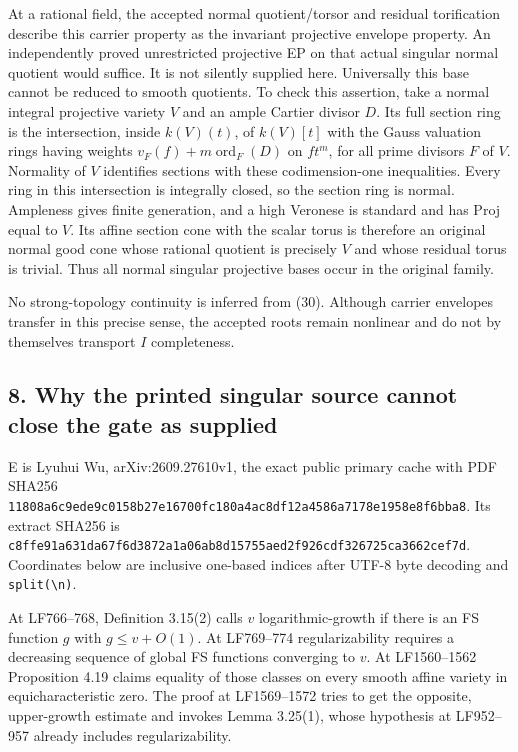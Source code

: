 \documentclass[
  10pt,
]{article}
\begin{document}
At a rational field, the accepted normal quotient/torsor and residual
torification describe this carrier property as the invariant projective
envelope property. An independently proved unrestricted projective EP on
that actual singular normal quotient would suffice. It is not silently
supplied here. Universally this base cannot be reduced to smooth
quotients. To check this assertion, take a normal integral projective
variety \(V\) and an ample Cartier divisor \(D\). Its full section ring
is the intersection, inside \(k(V)(t)\), of \(k(V)[t]\) with the Gauss
valuation rings having weights \(v_F(f)+m\operatorname{ord}_F(D)\) on
\(ft^m\), for all prime divisors \(F\) of \(V\). Normality of \(V\)
identifies sections with these codimension-one inequalities. Every ring
in this intersection is integrally closed, so the section ring is
normal. Ampleness gives finite generation, and a high Veronese is
standard and has Proj equal to \(V\). Its affine section cone with the
scalar torus is therefore an original normal good cone whose rational
quotient is precisely \(V\) and whose residual torus is trivial. Thus
all normal singular projective bases occur in the original family.

No strong-topology continuity is inferred from (30). Although carrier
envelopes transfer in this precise sense, the accepted roots remain
nonlinear and do not by themselves transport \(I\) completeness.

\subsection{8. Why the printed singular source cannot close the gate as
supplied}\label{why-the-printed-singular-source-cannot-close-the-gate-as-supplied}

E is Lyuhui Wu, arXiv:2609.27610v1, the exact public primary cache with
PDF SHA256
\nolinkurl{11808a6c9ede9c0158b27e16700fc180a4ac8df12a4586a7178e1958e8f6bba8}.
Its extract SHA256 is
\nolinkurl{c8ffe91a631da67f6d3872a1a06ab8d15755aed2f926cdf326725ca3662cef7d}.
Coordinates below are inclusive one-based indices after UTF-8 byte
decoding and
\texttt{split(\textquotesingle{}\textbackslash{}n\textquotesingle{})}.

At LF766--768, Definition 3.15(2) calls \(v\) logarithmic-growth if
there is an FS function \(g\) with \(g\leq v+O(1)\). At LF769--774
regularizability requires a decreasing sequence of global FS functions
converging to \(v\). At LF1560--1562 Proposition 4.19 claims equality of
those classes on every smooth affine variety in equicharacteristic zero.
The proof at LF1569--1572 tries to get the opposite, upper-growth
estimate and invokes Lemma 3.25(1), whose hypothesis at LF952--957
already includes regularizability.
\end{document}
